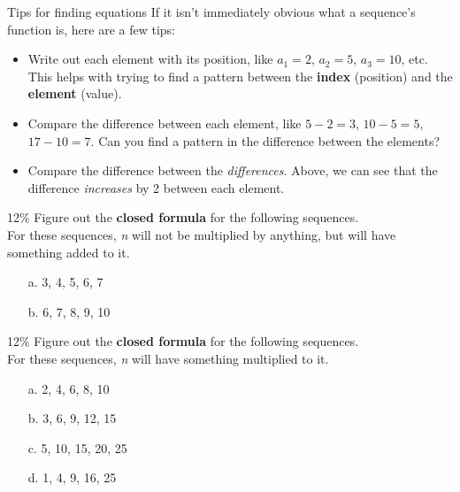 \documentclass[a4paper,12pt]{book}
\begin{document}
        \begin{hint}{Tips for finding equations}
            If it isn't immediately obvious what a sequence's function is, here are a few tips:
            
            \begin{itemize}
                \item Write out each element with its position, like
                $a_{1} = 2$, $a_{2} = 5$, $a_{3} = 10$, etc. This helps
                with trying to find a pattern between the \textbf{index} (position)
                and the \textbf{element} (value).
                
                \item Compare the difference between each element, like
                $5 - 2 = 3$, $10 - 5 = 5$, $17 - 10 = 7$. Can you find a pattern
                in the difference between the elements?
                
                \item Compare the difference between the \textit{differences}.
                Above, we can see that the difference \textit{increases}
                by 2 between each element.
            \end{itemize}
        \end{hint}

        \newpage{}
        
        \begin{question}{3}{12\%}
            Figure out the \textbf{closed formula} for the following sequences. \\
            For these sequences, \textit{n} will not be multiplied
            by anything, but will have something added to it. 

            \begin{itemize}
                \item[a.]  3, 4, 5, 6, 7
                \item[b.]  6, 7, 8, 9, 10
            \end{itemize}
        \end{question}

        \begin{question}{4}{12\%}
            Figure out the \textbf{closed formula} for the following sequences. \\
            For these sequences, \textit{n} will have something multiplied to it.

            \begin{itemize}
                \item[a.] 2, 4, 6, 8, 10
                \item[b.] 3, 6, 9, 12, 15
                \item[c.] 5, 10, 15, 20, 25
                \item[d.] 1, 4, 9, 16, 25
            \end{itemize}
        \end{question}
        
\end{document}

